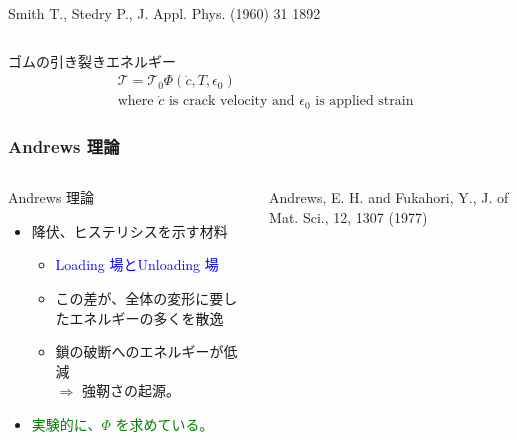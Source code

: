 \documentclass[12pt, dvipdfmx]{beamer}
\begin{document}
\begin{frame}
\begin{columns}[T, totalwidth=\textwidth]
\begin{center}
		{\tiny Smith T., Stedry P., J. Appl. Phys. (1960) 31 1892}
	\end{center}
    \end{columns}
    \begin{alertblock}{ゴムの引き裂きエネルギー}
		\vspace{-5mm}
		\begin{align*}
			&\mathcal{T}=\mathcal{T}_0 \Phi(\dot{c}, T, \epsilon_0) \\
			&\text{where $\dot{c}$ is crack velocity and $\epsilon_0$ is applied strain}
		\end{align*}
    \end{alertblock}
\end{frame}

\begin{frame}
	\frametitle{Andrews 理論}
	\begin{columns}[totalwidth=1\textwidth]
		\begin{exampleblock}{Andrews 理論}
			\begin{itemize}
			\item
			降伏、ヒステリシスを示す材料
				\begin{itemize}
				\item
				\textcolor{blue}{Loading 場とUnloading 場}
				\item
				\alert{この差}が、全体の変形に要したエネルギーの多くを\alert{散逸}
				\item
			鎖の破断へのエネルギーが低減 \\$\Rightarrow$ \alert{強靭さの起源。}
				\end{itemize}	
			\item
			\textcolor{green}{実験的に、$\Phi$ を求めている。}
			\end{itemize}
		\end{exampleblock}
		
		{Andrews, E. H. and Fukahori, Y., J. of Mat. Sci., 12, 1307 (1977)}
		

\end{columns}
\end{frame}
\end{document}
